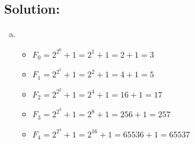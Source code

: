 \documentclass[12pt]{article}
\begin{document}
\subsection*{\textbf{Solution:}}

\begin{enumerate}[(a)]
\item
\begin{itemize}
	\item $F_0 = 2^{2^0} + 1 = 2^1 + 1 = 2 + 1 = 3$
	\item $F_1 = 2^{2^1} + 1 = 2^2 + 1 = 4 + 1 = 5$
	\item $F_2 = 2^{2^2} + 1 = 2^4 + 1 = 16 + 1 = 17$
	\item $F_3 = 2^{2^3} + 1 = 2^8 + 1 = 256 + 1 = 257$
	\item $F_4 = 2^{2^4} + 1 = 2^{16} + 1 = 65536 + 1 = 65537$
\end{itemize}
\end{enumerate}
\end{document}
